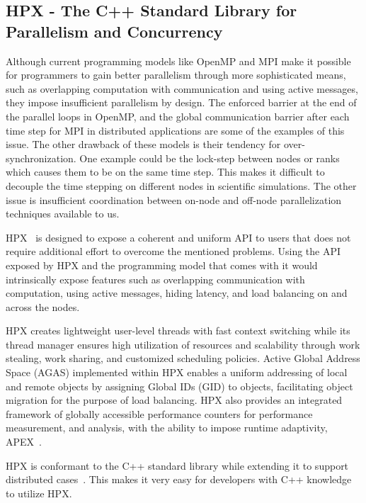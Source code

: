 \documentclass[12pt,letterpaper]{article}
\begin{document}
\subsection{HPX - The C++ Standard Library for Parallelism and
Concurrency}
\label{sec:hpx}
Although current programming models like OpenMP and MPI make it possible for programmers to gain better parallelism through more sophisticated means, such as overlapping computation with communication and using active messages, they impose insufficient parallelism by design. The enforced barrier at the end of the parallel loops in OpenMP, and the global communication barrier after each time step for MPI in distributed applications are some of the examples of this issue\cite{kaiser2014hpx}.
The other drawback of these models is their tendency for over-synchronization. One example could be the lock-step between nodes or ranks which causes them to be on the same time step. This makes it difficult to decouple the time stepping on different nodes in scientific simulations.
The other issue is insufficient coordination between on-node and off-node parallelization techniques available to us.

HPX~\cite{Kaiser2020} is designed to expose a coherent and uniform API to users that does not require additional effort to overcome the mentioned problems. Using the API exposed by HPX and the programming model that comes with it would intrinsically expose features such as overlapping communication with computation, using active messages, hiding latency, and load balancing on and across the nodes. 

HPX creates lightweight user-level threads with fast context switching while its thread manager ensures high utilization of resources and scalability through work stealing, work sharing, and customized scheduling policies.     
Active Global Address Space (AGAS) implemented within HPX enables a uniform addressing of local and remote objects by assigning Global IDs (GID) to objects, facilitating object migration for the purpose of load balancing\cite{Kaiser2020}. HPX also provides an integrated framework of globally accessible performance counters for performance measurement, and analysis, with the ability to impose runtime adaptivity, APEX~\cite{huck2015autonomic}. 

HPX is conformant to the C++ standard library while extending it to support distributed cases~\cite{standard2017programming}. This makes it very easy for developers with C++ knowledge to utilize HPX.
\end{document}
